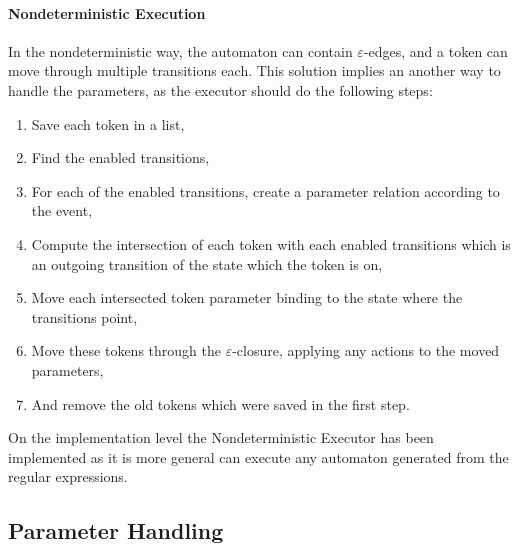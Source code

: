 	\paragraph{Nondeterministic Execution}
	In the nondeterministic way, the automaton can contain $\varepsilon$-edges, and a token can move through multiple transitions each. This solution implies an another way to handle the parameters, as the executor should do the following steps:
	\begin{enumerate}
		\item Save each token in a list,
		\item Find the enabled transitions,
		\item For each of the enabled transitions, create a parameter relation according to the event,
		\item Compute the intersection of each token with each enabled transitions which is an outgoing transition of the state which the token is on,
		\item Move each intersected token parameter binding to the state where the transitions point,
		\item Move these tokens through the $\varepsilon$-closure, applying any actions to the moved parameters,
		\item And remove the old tokens which were saved in the first step.
	\end{enumerate}

	On the implementation level the Nondeterministic Executor has been implemented as it is more general can execute any automaton generated from the regular expressions.



	

	\subsection{Parameter Handling}
	\label{section:algo:paramhandling}
	

